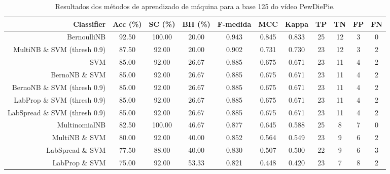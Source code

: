 \begin{table}[!htb]
\centering
\caption{Resultados dos métodos de aprendizado de máquina para a base 125 do vídeo PewDiePie.}
\label{tab:PewDiePie-125}
\begin{tabular}{r|c|c|c|c|c|c|c|c|c|c}
\hline\hline
Classifier & Acc (\%) & SC (\%) & BH (\%) & F-medida & MCC & Kappa & TP & TN & FP & FN \\ \hline
BernoulliNB & 92.50 & 100.00 & 20.00 & 0.943 & 0.845 & 0.833 & 25 & 12 & 3 & 0 \\ 
MultiNB \& SVM (thresh 0.9) & 87.50 & 92.00 & 20.00 & 0.902 & 0.731 & 0.730 & 23 & 12 & 3 & 2 \\ 
SVM & 85.00 & 92.00 & 26.67 & 0.885 & 0.675 & 0.671 & 23 & 11 & 4 & 2 \\ 
BernoNB \& SVM & 85.00 & 92.00 & 26.67 & 0.885 & 0.675 & 0.671 & 23 & 11 & 4 & 2 \\ 
BernoNB \& SVM (thresh 0.9) & 85.00 & 92.00 & 26.67 & 0.885 & 0.675 & 0.671 & 23 & 11 & 4 & 2 \\ 
LabProp \& SVM (thresh 0.9) & 85.00 & 92.00 & 26.67 & 0.885 & 0.675 & 0.671 & 23 & 11 & 4 & 2 \\ 
LabSpread \& SVM (thresh 0.9) & 85.00 & 92.00 & 26.67 & 0.885 & 0.675 & 0.671 & 23 & 11 & 4 & 2 \\ 
MultinomialNB & 82.50 & 100.00 & 46.67 & 0.877 & 0.645 & 0.588 & 25 & 8 & 7 & 0 \\ 
MultiNB \& SVM & 80.00 & 92.00 & 40.00 & 0.852 & 0.564 & 0.549 & 23 & 9 & 6 & 2 \\ 
LabSpread \& SVM & 77.50 & 88.00 & 40.00 & 0.830 & 0.507 & 0.500 & 22 & 9 & 6 & 3 \\ 
LabProp \& SVM & 75.00 & 92.00 & 53.33 & 0.821 & 0.448 & 0.420 & 23 & 7 & 8 & 2 \\ 
\hline\hline
\end{tabular}
\end{table}
